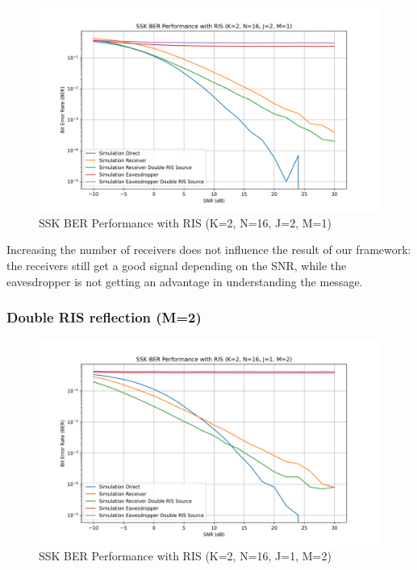 \begin{figure}[H]
  \centering
  \includegraphics[width=\linewidth]{imgs/ber-simulations/SSK BER Performance with RIS (K=2, N=16, J=2, M=1).png}
  \caption{SSK BER Performance with RIS (K=2, N=16, J=2, M=1)}
  \label{fig:simulation_j2_m1}
\end{figure}

Increasing the number of receivers does not influence the result of our framework: the receivers still get a good signal depending on the SNR, while the eavesdropper is not getting an advantage in understanding the message.

\subsubsection{Double RIS reflection (M=2)}

\begin{figure}[H]
  \centering
  \includegraphics[width=\linewidth]{imgs/ber-simulations/SSK BER Performance with RIS (K=2, N=16, J=1, M=2).png}
  \caption{SSK BER Performance with RIS (K=2, N=16, J=1, M=2)}
  \label{fig:simulation_j1_m2}
\end{figure}

